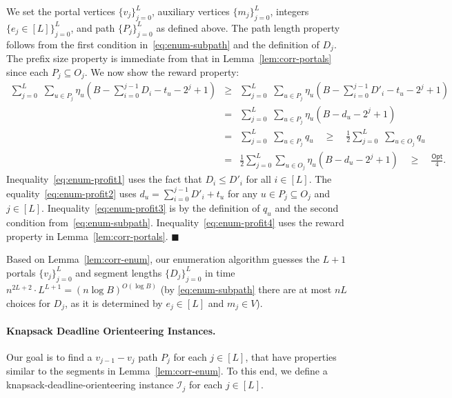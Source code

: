 \documentclass[11pt,letterpaper]{article}
\numberwithin{algorithm}{section}
\newenvironment{proof}{

\noindent{\bf Proof:}}
{\hfill$\blacksquare$


}
\newcommand{\sse}{\subseteq}
\newcommand{\I}{{\mathcal{I}}}
\newcommand{\Opt}{\ensuremath{\mathsf{Opt}}\xspace}
\begin{document}
\begin{proof}
We set the portal vertices $\{v_j\}_{j=0}^L$, auxiliary vertices $\{m_j\}_{j=0}^L$, integers $\{e_j \in [L]\}_{j=0}^L$, and path $\{P_j\}_{j=0}^L$ as defined above.  The path length property follows from the first condition in~\eqref{eq:enum-subpath} and the definition of $D_j$. The prefix size property is immediate from that in Lemma~\ref{lem:corr-portals} since each $P_j\sse O_j$.
We now show the reward property:
\begin{eqnarray}
\sum_{j=0}^L \,\, \sum_{u\in P_j} \eta_u(B-\sum_{i=0}^{j-1} D_i - t_u - 2^j+1) &\ge & \sum_{j=0}^L \,\, \sum_{u\in P_j} \eta_u(B-\sum_{i=0}^{j-1} D'_i - t_u - 2^j+1) \label{eq:enum-profit1}\\
&=& \sum_{j=0}^L \,\, \sum_{u\in P_j} \eta_u(B- d_u - 2^j+1) \label{eq:enum-profit2}\\
&=& \sum_{j=0}^L \,\, \sum_{u\in P_j} q_u \quad \ge \quad \frac{1}{2} \sum_{j=0}^L \,\, \sum_{u\in O_j} q_u \label{eq:enum-profit3}\\
&= & \frac{1}{2} \sum_{j=0}^L \sum_{u\in O_j} \eta_u(B- d_u - 2^j+1)\quad \ge \quad \frac{\Opt}{4}. \label{eq:enum-profit4}
\end{eqnarray}
Inequality~\eqref{eq:enum-profit1} uses the fact that $D_i\le D'_i$ for all $i\in[L]$. The  equality~\eqref{eq:enum-profit2} uses $d_u=\sum_{i=0}^{j-1} D'_i + t_u$ for any $u\in P_j\sse O_j$ and $j\in[L]$. Inequality~\eqref{eq:enum-profit3} is by the definition of $q_u$ and the second condition from~\eqref{eq:enum-subpath}. Inequality~\eqref{eq:enum-profit4} uses the reward property in Lemma~\ref{lem:corr-portals}.
\end{proof}
Based on Lemma~\ref{lem:corr-enum}, our enumeration algorithm guesses the $L+1$ portals $\{v_j\}_{j=0}^L$ and segment lengths $\{D_j\}_{j=0}^L$ in time $n^{2L+2}\cdot L^{L+1}=(n\log B)^{O(\log B)}$ (by 
\eqref{eq:enum-subpath} there are at most $nL$ choices for $D_j$, as it is determined by  $e_j  \in [L]$ and $m_j 
\in V$). 


\paragraph{Knapsack Deadline Orienteering Instances.} Our goal is to find a $v_{j-1}-v_j$ path $P_j$ for each $j\in[L]$, that have properties similar to the segments in Lemma~\ref{lem:corr-enum}. To this end, we define a knapsack-deadline-orienteering instance $\I_j$ for each $j\in[L]$.
\end{document}
